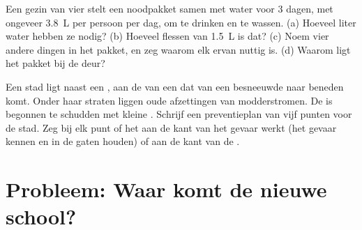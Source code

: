 \begin{exercise}[$\star\star\star$]\label{exo:g9:natural-risks:11}
Een gezin van vier stelt een noodpakket samen met water voor 3 dagen, met
ongeveer \qty{3.8}{L} per persoon per dag, om te drinken en te wassen.
(a) Hoeveel liter water hebben ze nodig? (b) Hoeveel flessen van
\qty{1.5}{L} is dat? (c) Noem vier andere dingen in het pakket, en zeg
waarom elk ervan nuttig is. (d) Waarom ligt het pakket bij de deur?
\end{exercise}

\begin{exercise}[$\star\star\star$]\label{exo:g9:natural-risks:12}
Een stad ligt naast een , aan de  van een  dat van een
besneeuwde  naar beneden komt. Onder haar straten liggen oude
afzettingen van modderstromen. De  is begonnen te schudden met
kleine . Schrijf een preventieplan van vijf punten voor de
stad. Zeg bij elk punt of het aan de kant van het gevaar werkt (het gevaar
kennen en in de gaten houden) of aan de kant van de .
\end{exercise}

\section{Probleem: Waar komt de nieuwe school?}

